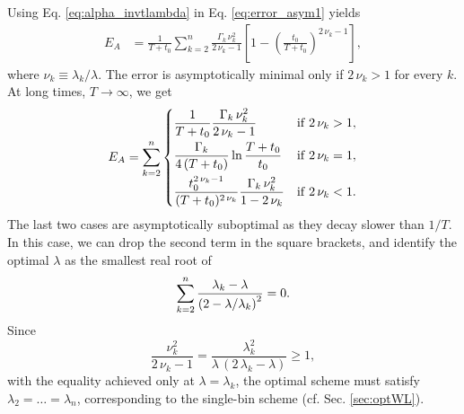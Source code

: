 \documentclass[reprint, floatfix]{revtex4-1}
\newcommand{\Err}{E}
\begin{document}
Using Eq. \eqref{eq:alpha_invtlambda}
in Eq. \eqref{eq:error_asym1} yields
%
\begin{align}
\Err_A
&=
\frac{    1    }
     { T + t_0 }
\sum_{k = 2}^n
  \frac{ \Gamma_k \, \nu_k^2 }
       {    2 \, \nu_k - 1   }
\left[
  1 - \left(
        \frac {     t_0 }
              { T + t_0 }
      \right)^{ 2 \, \nu_k - 1 }
\right],
\label{eq:error_asym_invt}
\end{align}
%
where $\nu_k \equiv \lambda_k / \lambda$.
%
The error is asymptotically minimal
only if $2\,\nu_k > 1$ for every $k$.
%
At long times, $T \to \infty$, we get
$$
\begin{aligned}
  \Err_A
  =
  \sum_{k = 2}^n
  \begin{dcases}
    \frac{    1    }
         { T + t_0 }
    \frac{ \Gamma_k \, \nu_k^2 }
         {   2 \, \nu_k - 1    }
    &
    \mathrm{if \;} 2 \, \nu_k > 1,
    \\%
    \frac{    \Gamma_k    }
         { 4 \, (T + t_0) }
    \ln \frac{ T + t_0 }
             {   t_0   }
    &
    \mathrm{if \;} 2 \, \nu_k = 1,
    \\
    \frac{  t_0^{ 2 \, \nu_k  - 1}  }
         { (T + t_0)^{ 2 \, \nu_k } }
    \frac{ \Gamma_k \, \nu_k^2 }
         {   1 - 2 \, \nu_k    }
    &
    \mathrm{if \;} 2 \, \nu_k < 1.
  \end{dcases}
\end{aligned}
$$
%
The last two cases
are asymptotically suboptimal
as they decay slower than $1/T$.
%
In this case,
we can drop the second term
in the square brackets,
and identify the optimal $\lambda$ as
the smallest real root of
%
\begin{equation}
  \sum_{k = 2}^n
    \frac { \lambda_k - \lambda }
          { \left(2 - \lambda/ \lambda_k \right)^2 }
  = 0.
\notag
\end{equation}
%
Since
$$
\frac{ \nu_k^2        }
     { 2 \, \nu_k - 1 }
=
\frac{ \lambda_k^2 }
     { \lambda \, (2 \, \lambda_k - \lambda) }
\ge 1
,
$$
with the equality achieved only at $\lambda = \lambda_k$,
the optimal scheme must satisfy
$\lambda_2 = \dots = \lambda_n$,
corresponding to the single-bin scheme
(cf. Sec. \ref{sec:optWL}).
\end{document}
